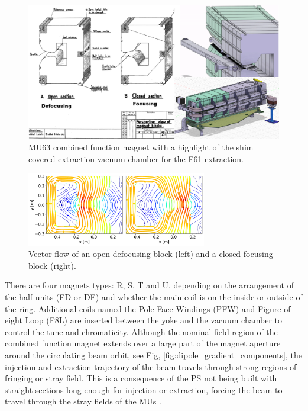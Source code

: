 \begin{figure}[H]
\centering
\includegraphics[width=1.0\textwidth]{01_Introduction/images/combined_function_magnets.png}
\caption{MU63 combined function magnet with a highlight of the shim covered extraction vacuum chamber for the F61 extraction.}
\label{fig:combined_fuction_magnet}
\end{figure}

\begin{figure}[H]
\centering
\includegraphics[width=0.7\textwidth]{01_Introduction/images/vector_flow.png}
\caption{Vector flow of an open defocusing block (left) and a closed focusing block (right).}
\label{fig:vector_flow}
\end{figure}

There are four magnets types: R, S, T and U, depending on the arrangement of the half-units (FD or DF) and whether the main coil is on the inside or outside of the ring. Additional coils named the Pole Face Windings (PFW) and Figure-of-eight Loop (F8L) are inserted between the yoke and the vacuum chamber to control the tune and chromaticity. Although the nominal field region of the combined function
magnet extends over a large part of the magnet aperture around the circulating beam orbit, see Fig, \ref{fig:dipole_gradient_components}, the injection and extraction trajectory of the beam travels through strong regions of fringing or stray field. This is a consequence of the PS not being built with straight sections long enough for injection or extraction, forcing the beam to travel through the stray fields of the MUs \cite{risselada_beam_nodate}.
 
